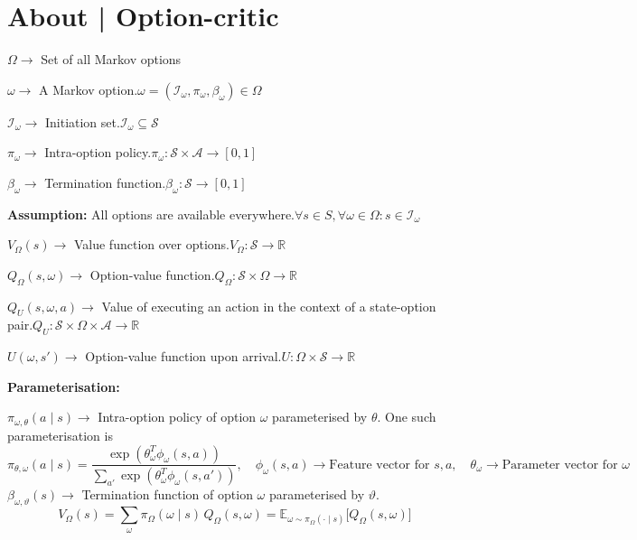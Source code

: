\section*{About | Option-critic~\cite{bacon2017option, Sutton1999}}

\( \Omega \to \) Set of all Markov options

\( \omega \to \) A Markov option.\@ \( \omega = (\mathcal{I}_\omega, \pi_\omega, \beta_\omega) \in \Omega \)

\( \mathcal{I}_\omega \to \) Initiation set.\@ \( \mathcal{I}_\omega \subseteq \mathcal{S} \)

\( \pi_\omega \to \) Intra-option policy.\@ \( \pi_\omega: \mathcal{S} \times \mathcal{A} \to [0, 1] \)

\( \beta_\omega \to \) Termination function.\@ \( \beta_\omega: \mathcal{S} \to [0, 1] \)

\textbf{Assumption:} All options are available everywhere.\@ \( \forall s \in S, \forall \omega \in \Omega: s \in \mathcal{I}_\omega \)

\( V_\Omega(s) \to \) Value function over options.\@ \( V_\Omega: \mathcal{S} \to \mathbb{R} \)

\( Q_\Omega(s, \omega) \to \) Option-value function.\@ \( Q_\Omega: \mathcal{S} \times \Omega \to \mathbb{R} \)

\( Q_U(s, \omega, a) \to \) Value of executing an action in the context of a state-option pair.\@ \( Q_U: \mathcal{S} \times \Omega \times \mathcal{A} \to \mathbb{R} \)

\( U(\omega, s') \to \) Option-value function upon arrival.\@ \( U: \Omega \times \mathcal{S} \to \mathbb{R} \)

\textbf{Parameterisation:}

\( \pi_{\omega, \theta}(a \mid s) \to \) Intra-option policy of option \( \omega \) parameterised by \( \theta \).
One such parameterisation is
\begin{equation}
    \pi_{\theta, \omega}(a \mid s)
    =
    \frac{\exp(\theta_\omega^T \phi_\omega(s, a))}{\sum_{a'} \exp(\theta_\omega^T \phi_\omega(s, a'))}
    , \quad
    \phi_\omega(s, a)
    \to
    \text{Feature vector for } s, a
    , \quad
    \theta_\omega
    \to
    \text{Parameter vector for } \omega
\end{equation}
\( \beta_{\omega, \vartheta}(s) \to \) Termination function of option \( \omega \) parameterised by \( \vartheta \).
\begin{equation}
    V_\Omega(s)
    =
    \sum_{\omega} \pi_\Omega(\omega \mid s) \, Q_\Omega(s, \omega)
    =
    \mathbb{E}_{\omega \sim \pi_\Omega(\cdot \mid s)} \Big[ Q_\Omega(s, \omega) \Big]
    \label{eq:V_Omega}
\end{equation}

